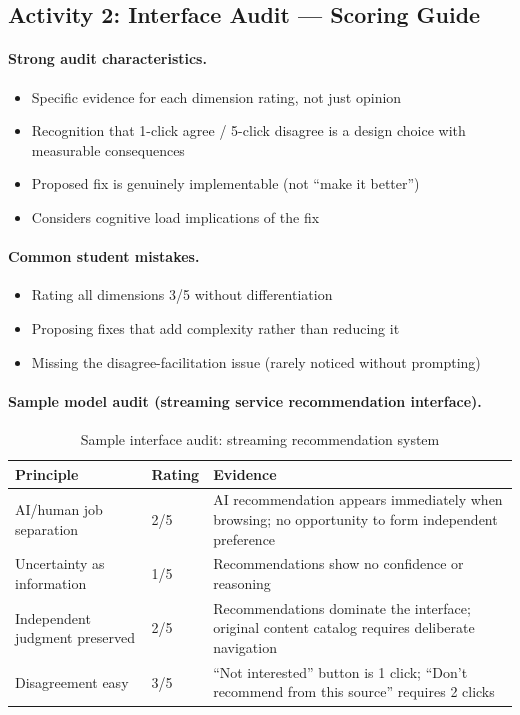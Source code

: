 \subsection{Activity 2: Interface Audit --- Scoring Guide}

\paragraph{Strong audit characteristics.}
\begin{itemize}
    \item Specific evidence for each dimension rating, not just opinion
    \item Recognition that 1-click agree / 5-click disagree is a design choice with measurable consequences
    \item Proposed fix is genuinely implementable (not ``make it better'')
    \item Considers cognitive load implications of the fix
\end{itemize}

\paragraph{Common student mistakes.}
\begin{itemize}
    \item Rating all dimensions 3/5 without differentiation
    \item Proposing fixes that add complexity rather than reducing it
    \item Missing the disagree-facilitation issue (rarely noticed without prompting)
\end{itemize}

\paragraph{Sample model audit (streaming service recommendation interface).}

\begin{table}[htbp]
\caption{Sample interface audit: streaming recommendation system}
\label{tab:audit-sample-ch06}
\centering
\begin{tabular}{@{}p{4cm}p{1.5cm}p{6cm}@{}}
\toprule
\textbf{Principle} & \textbf{Rating} & \textbf{Evidence} \\
\midrule
AI/human job separation & 2/5 & AI recommendation appears immediately when browsing; no opportunity to form independent preference \\
Uncertainty as information & 1/5 & Recommendations show no confidence or reasoning \\
Independent judgment preserved & 2/5 & Recommendations dominate the interface; original content catalog requires deliberate navigation \\
Disagreement easy & 3/5 & ``Not interested'' button is 1 click; ``Don't recommend from this source'' requires 2 clicks \\
\bottomrule
\end{tabular}
\end{table}

